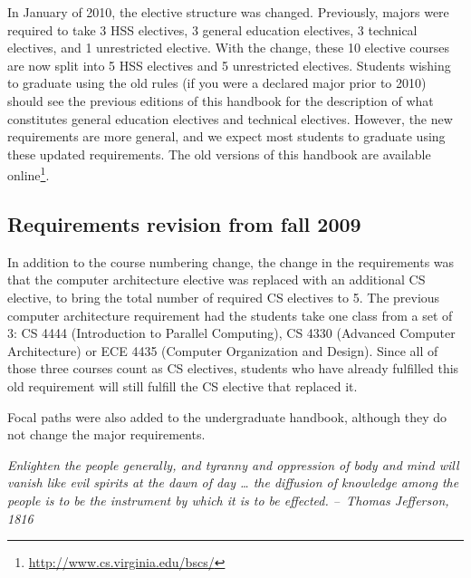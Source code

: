 \documentclass[10pt,letter]{book}
\newcommand{\myurl}[1]{\footnote{\scriptsize\url{#1}}}
\begin{document}
In January of 2010, the elective structure was changed. Previously,
majors were required to take 3 HSS electives, 3 general education
electives, 3 technical electives, and 1 unrestricted elective. With
the change, these 10 elective courses are now split into 5 HSS
electives and 5 unrestricted electives. Students wishing to graduate
using the old rules (if you were a declared major prior to 2010)
should see the previous editions of this handbook for the description
of what constitutes general education electives and technical
electives. However, the new requirements are more general, and we
expect most students to graduate using these updated requirements. The
old versions of this handbook are available
online\myurl{http://www.cs.virginia.edu/bscs/}.

\subsection{Requirements revision from fall 2009}

In addition to the course numbering change, the change in the
requirements was that the computer architecture elective was replaced
with an additional CS elective, to bring the total number of required
CS electives to 5. The previous computer architecture requirement had
the students take one class from a set of 3: CS 4444
(Introduction to Parallel Computing), CS 4330 (Advanced Computer
Architecture) or ECE 4435 (Computer Organization and
Design). Since all of those three courses count as CS electives,
students who have already fulfilled this old requirement will still
fulfill the CS elective that replaced it.

Focal paths were also added to the undergraduate handbook, although
they do not change the major requirements.

\cleardoublepage
\pagestyle{empty}

\vspace*{2in}

\begin{center}
\parbox{2.5in}{{\em Enlighten the people generally, and tyranny and
    oppression of body and mind will vanish like evil spirits at the
    dawn of day … the diffusion of knowledge among the people is to be
    the instrument by which it is to be effected.\linebreak\linebreak
    --~Thomas Jefferson, 1816}}
\end{center}


\clearpage
\end{document}
